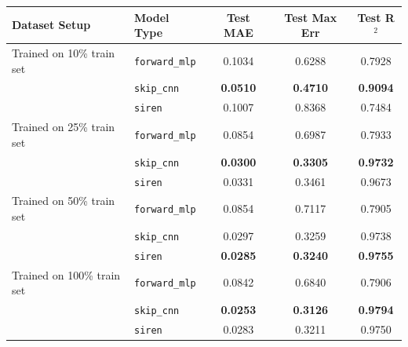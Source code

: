 \begin{tabular}{llccc}
    \toprule
    \textbf{Dataset Setup} & \textbf{Model Type} & \textbf{Test MAE} & \textbf{Test Max Err} & \textbf{Test R$^2$} \\
    \midrule
        Trained on 10\% train set & \texttt{forward\_mlp} & 0.1034 & 0.6288 & 0.7928 \\
         & \texttt{skip\_cnn} & \textbf{0.0510} & \textbf{0.4710} & \textbf{0.9094} \\
         & \texttt{siren} & 0.1007 & 0.8368 & 0.7484 \\
        \midrule
        Trained on 25\% train set & \texttt{forward\_mlp} & 0.0854 & 0.6987 & 0.7933 \\
         & \texttt{skip\_cnn} & \textbf{0.0300} & \textbf{0.3305} & \textbf{0.9732} \\
         & \texttt{siren} & 0.0331 & 0.3461 & 0.9673 \\
        \midrule
        Trained on 50\% train set & \texttt{forward\_mlp} & 0.0854 & 0.7117 & 0.7905 \\
         & \texttt{skip\_cnn} & 0.0297 & 0.3259 & 0.9738 \\
         & \texttt{siren} & \textbf{0.0285} & \textbf{0.3240} & \textbf{0.9755} \\
        \midrule
        Trained on 100\% train set & \texttt{forward\_mlp} & 0.0842 & 0.6840 & 0.7906 \\
         & \texttt{skip\_cnn} & \textbf{0.0253} & \textbf{0.3126} & \textbf{0.9794} \\
         & \texttt{siren} & 0.0283 & 0.3211 & 0.9750 \\
    \bottomrule
\end{tabular}
